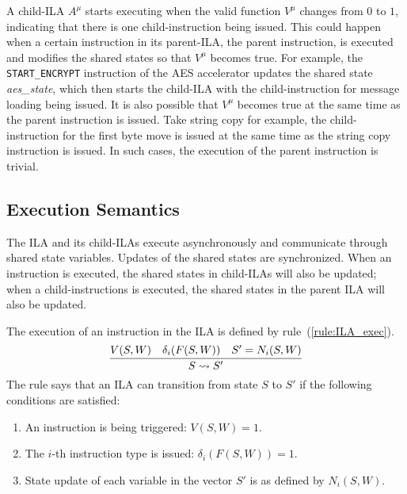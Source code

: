 A child-ILA $A^\mu$ starts executing when the valid function $V^\mu$ changes 
from $0$ to $1$, indicating that there is one child-instruction being issued.
%
This could happen when a certain instruction in its parent-ILA, the parent 
instruction, is executed and modifies the shared states so that $V^\mu$ becomes 
true.
For example, the \texttt{START\_ENCRYPT} instruction of the AES accelerator 
updates the shared state \textit{aes\_state}, which then starts the child-ILA
with the child-instruction for message loading being issued.
%
It is also possible that $V^\mu$ becomes true at the same time as the parent
instruction is issued.
Take string copy for example, the child-instruction for the first
byte move is issued at the same time as the string copy instruction is issued.
In such cases, the execution of the parent instruction is trivial.

\subsection*{Execution Semantics}
The ILA and its child-ILAs execute asynchronously and communicate through shared
state variables. 
Updates of the shared states are synchronized.
When an instruction is executed, the shared states in child-ILAs will also be 
updated; when a child-instructions is executed, the shared states in the parent
ILA will also be updated.

The execution of an instruction in the ILA is defined by 
rule~(\ref{rule:ILA_exec}).
%
\begin{equation}
  \infer{S \rightsquigarrow S'}
        {V(S, W) & \delta_i(F(S, W)) & S' = N_i(S, W)}
  \label{rule:ILA_exec}
\end{equation}
%
The rule says that an ILA can transition from state $S$ to $S'$ if the following 
conditions are satisfied:
\begin{enumerate}
  \item An instruction is being triggered: $V(S, W) = 1$.
  \item The $i$-th instruction type is issued: $\delta_i(F(S, W)) = 1$.
  \item State update of each variable in the vector $S'$ is as defined by 
        $N_i (S, W)$.
\end{enumerate}

